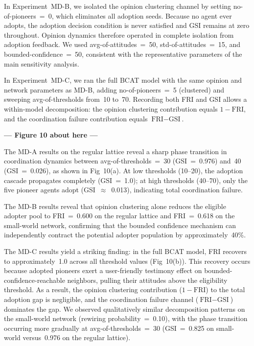 \documentclass[10pt,letterpaper]{article}
\begin{document}
In Experiment~MD-B, we isolated the opinion clustering channel by setting no-of-pioneers~=~0, which eliminates all adoption seeds. Because no agent ever adopts, the adoption decision condition is never satisfied and GSI remains at zero throughout. Opinion dynamics therefore operated in complete isolation from adoption feedback. We used avg-of-attitudes~=~50, std-of-attitudes~=~15, and bounded-confidence~=~50, consistent with the representative parameters of the main sensitivity analysis.

In Experiment~MD-C, we ran the full BCAT model with the same opinion and network parameters as MD-B, adding no-of-pioneers~=~5 (clustered) and sweeping avg-of-thresholds from~10 to~70. Recording both FRI and GSI allows a within-model decomposition: the opinion clustering contribution equals $1 - \text{FRI}$, and the coordination failure contribution equals $\text{FRI} - \text{GSI}$.



\begin{center}\textbf{--- Figure 10 about here ---}\end{center}


The MD-A results on the regular lattice reveal a sharp phase transition in coordination dynamics between avg-of-thresholds~=~30 (GSI~=~0.976) and~40 (GSI~=~0.026), as shown in Fig~10(a). At low thresholds (10--20), the adoption cascade propagates completely (GSI~=~1.0); at high thresholds (40--70), only the five pioneer agents adopt (GSI~$\approx$~0.013), indicating total coordination failure.

The MD-B results reveal that opinion clustering alone reduces the eligible adopter pool to FRI~=~0.600 on the regular lattice and FRI~=~0.618 on the small-world network, confirming that the bounded confidence mechanism can independently contract the potential adopter population by approximately~40\%.

The MD-C results yield a striking finding: in the full BCAT model, FRI recovers to approximately~1.0 across all threshold values (Fig~10(b)). This recovery occurs because adopted pioneers exert a user-friendly testimony effect on bounded-confidence-reachable neighbors, pulling their attitudes above the eligibility threshold. As a result, the opinion clustering contribution ($1 - \text{FRI}$) to the total adoption gap is negligible, and the coordination failure channel ($\text{FRI} - \text{GSI}$) dominates the gap. We observed qualitatively similar decomposition patterns on the small-world network (rewiring probability~=~0.10), with the phase transition occurring more gradually at avg-of-thresholds~=~30 (GSI~=~0.825 on small-world versus~0.976 on the regular lattice).
\end{document}
